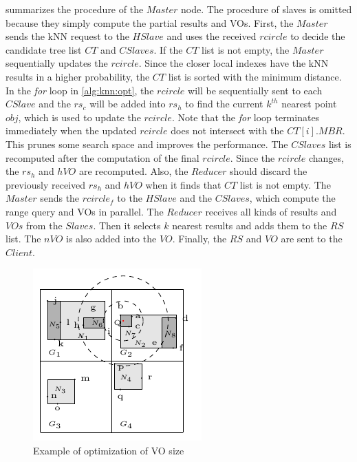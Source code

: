  summarizes the procedure of the $Master$ node. The procedure of slaves is omitted because they simply compute the partial results and VOs. First, the $Master$ sends the kNN request to the $HSlave$ and uses the received $rcircle$ to decide the candidate tree list $CT$ and $CSlaves$. If the $CT$ list is not empty, the $Master$ sequentially updates the $rcircle$. Since the closer local indexes have the kNN results in a higher probability, the $CT$ list is sorted with the minimum distance. In the \emph{for} loop in \cref{alg:knn:opt}, the $rcircle$ will be sequentially sent to each $CSlave$ and the $rs_{c}$ will be added into $rs_{h}$ to find the current $k^{th}$ nearest point $obj$, which is used to update the $rcircle$. Note that the \emph{for} loop terminates immediately when the updated $rcircle$ does not intersect with the $CT[i].MBR$. This prunes some search space and improves the performance. The $CSlaves$ list is recomputed after the computation of the final $rcircle$. Since the $rcircle$ changes, the $rs_{h}$ and $hVO$ are recomputed. Also, the $Reducer$ should discard the previously received $rs_{h}$ and $hVO$ when it finds that $CT$ list is not empty. The $Master$ sends the $rcircle_{f}$ to the $HSlave$ and the $CSlaves$, which compute the range query and VOs in parallel. The $Reducer$ receives all kinds of results and $VOs$ from the $Slaves$. Then it selects $k$ nearest results and adds them to the $RS$ list. The $nVO$ is also added into the $VO$. Finally, the $RS$ and $VO$ are sent to the $Client$.

\begin{figure}[t]
  \centering
  \includegraphics[width=.4\linewidth]{figs/knn/optimize.pdf}
  \caption{Example of optimization of VO size}\label{fig:knn:opt}
\end{figure}

